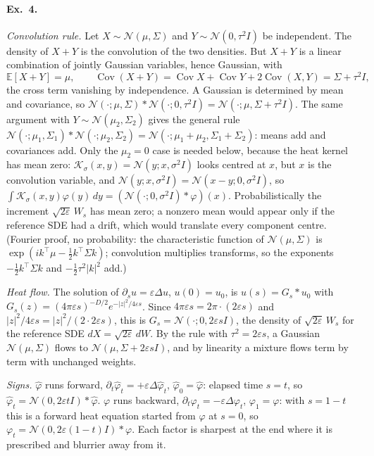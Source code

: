 \documentclass[11pt]{article}
\newcommand{\eps}{\varepsilon}
\newcommand{\Nc}{\mathcal{N}}
\newcommand{\Kc}{\mathcal{K}}
\newcommand{\hphi}{\hat\varphi}
\newcounter{ex}
\begin{document}
\paragraph{Ex.\ 4.}
\emph{Convolution rule.} Let $X\sim\Nc(\mu,\Sigma)$ and $Y\sim\Nc(0,\tau^2I)$ be
independent. The density of $X+Y$ is the convolution of the two densities. But $X+Y$ is
a linear combination of jointly Gaussian variables, hence Gaussian, with
\[
  \mathbb E[X+Y]=\mu,\qquad
  \operatorname{Cov}(X+Y)=\operatorname{Cov}X+\operatorname{Cov}Y+2\operatorname{Cov}(X,Y)=\Sigma+\tau^2I,
\]
the cross term vanishing by independence. A Gaussian is determined by mean and
covariance, so $\Nc(\cdot;\mu,\Sigma)*\Nc(\cdot;0,\tau^2I)=\Nc(\cdot;\mu,\Sigma+\tau^2I)$.
The same argument with $Y\sim\Nc(\mu_2,\Sigma_2)$ gives the general rule
$\Nc(\cdot;\mu_1,\Sigma_1)*\Nc(\cdot;\mu_2,\Sigma_2)=\Nc(\cdot;\mu_1+\mu_2,\Sigma_1+\Sigma_2)$:
means add and covariances add. Only the $\mu_2=0$ case is needed below, because the heat
kernel has mean zero: $\Kc_\sigma(x,y)=\Nc(y;x,\sigma^2I)$ looks centred at $x$, but $x$ is the
convolution variable, and $\Nc(y;x,\sigma^2I)=\Nc(x-y;0,\sigma^2I)$, so
$\int\Kc_\sigma(x,y)\varphi(y)\,dy=(\Nc(\cdot;0,\sigma^2I)*\varphi)(x)$. Probabilistically the
increment $\sqrt{2\eps}\,W_s$ has mean zero; a nonzero mean would appear only if the reference
SDE had a drift, which would translate every component centre.
(Fourier proof, no probability: the characteristic function of $\Nc(\mu,\Sigma)$ is
$\exp(ik^{\!\top}\mu-\tfrac12k^{\!\top}\Sigma k)$; convolution multiplies transforms, so the
exponents $-\tfrac12k^{\!\top}\Sigma k$ and $-\tfrac12\tau^2|k|^2$ add.)

\emph{Heat flow.} The solution of $\partial_su=\eps\Delta u$, $u(0)=u_0$, is $u(s)=G_s*u_0$
with $G_s(z)=(4\pi\eps s)^{-D/2}e^{-|z|^2/4\eps s}$. Since $4\pi\eps s=2\pi\cdot(2\eps s)$ and
$|z|^2/4\eps s=|z|^2/(2\cdot2\eps s)$, this is $G_s=\Nc(\cdot;0,2\eps sI)$, the density of
$\sqrt{2\eps}\,W_s$ for the reference SDE $dX=\sqrt{2\eps}\,dW$. By the rule with
$\tau^2=2\eps s$, a Gaussian $\Nc(\mu,\Sigma)$ flows to $\Nc(\mu,\Sigma+2\eps sI)$, and by
linearity a mixture flows term by term with unchanged weights.

\emph{Signs.} $\hphi$ runs forward, $\partial_t\hphi_t=+\eps\Delta\hphi_t$, $\hphi_0=\hphi$:
elapsed time $s=t$, so $\hphi_t=\Nc(0,2\eps tI)*\hphi$. $\varphi$ runs backward,
$\partial_t\varphi_t=-\eps\Delta\varphi_t$, $\varphi_1=\varphi$: with $s=1-t$ this is a forward
heat equation started from $\varphi$ at $s=0$, so $\varphi_t=\Nc(0,2\eps(1-t)I)*\varphi$.
Each factor is sharpest at the end where it is prescribed and blurrier away from it.
\end{document}
